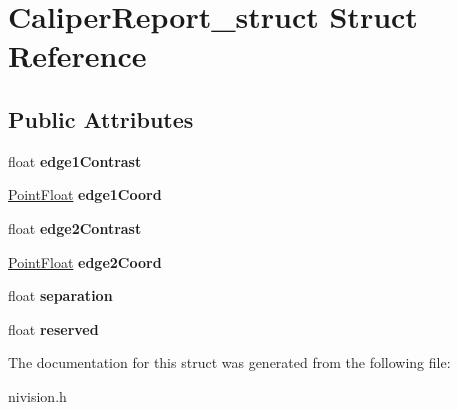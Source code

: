 \hypertarget{structCaliperReport__struct}{\section{\-Caliper\-Report\-\_\-struct \-Struct \-Reference}
\label{structCaliperReport__struct}
}
\subsection*{\-Public \-Attributes}
\begin{DoxyCompactItemize}
\item 
\hypertarget{structCaliperReport__struct_a013604bfcc7f931fe9d940a7ef8185cd}{float {\bfseries edge1\-Contrast}}\label{structCaliperReport__struct_a013604bfcc7f931fe9d940a7ef8185cd}

\item 
\hypertarget{structCaliperReport__struct_a7388d1b1764a1f7bbacc84274182ca63}{\hyperlink{structPointFloat__struct}{\-Point\-Float} {\bfseries edge1\-Coord}}\label{structCaliperReport__struct_a7388d1b1764a1f7bbacc84274182ca63}

\item 
\hypertarget{structCaliperReport__struct_ae497e44c4bd09a9396ce1588eb783ee0}{float {\bfseries edge2\-Contrast}}\label{structCaliperReport__struct_ae497e44c4bd09a9396ce1588eb783ee0}

\item 
\hypertarget{structCaliperReport__struct_ad6d3ec530de336d45c07aec4a857e4a4}{\hyperlink{structPointFloat__struct}{\-Point\-Float} {\bfseries edge2\-Coord}}\label{structCaliperReport__struct_ad6d3ec530de336d45c07aec4a857e4a4}

\item 
\hypertarget{structCaliperReport__struct_ac3e64660b799f6b920e06c83053ce0a3}{float {\bfseries separation}}\label{structCaliperReport__struct_ac3e64660b799f6b920e06c83053ce0a3}

\item 
\hypertarget{structCaliperReport__struct_af2c5d01c460c44ef7e38ae6f9192878c}{float {\bfseries reserved}}\label{structCaliperReport__struct_af2c5d01c460c44ef7e38ae6f9192878c}

\end{DoxyCompactItemize}


\-The documentation for this struct was generated from the following file\-:\begin{DoxyCompactItemize}
\item 
nivision.\-h\end{DoxyCompactItemize}
